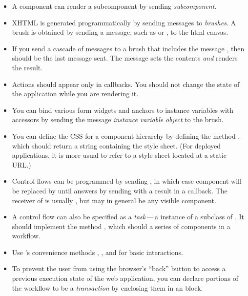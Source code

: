 \documentclass[a4paper,10pt,twoside]{book}
\begin{document}
\begin{itemize}
  \item A component can render a subcomponent by sending  \emph{subcomponent}.
  \item XHTML is generated programmatically by sending messages to \emph{brushes}. A brush is obtained by sending a message, such as  or , to the html canvas.
  \item If you send a cascade of messages to a brush that includes the message , then  should be the last message sent.
  The  message sets the contents \emph{and} renders the result.
  \item Actions should appear only in callbacks.
You should not change the state of the application while you are rendering it.
  \item You can bind various form widgets and anchors to instance variables with accessors by sending the message  \emph{instance variable}  \emph{object} to the brush.
  \item You can define the CSS for a component hierarchy by defining the method , which should return a string containing the style sheet.
  (For deployed applications, it is more usual to refer to a style sheet located at a static URL.)
  \item Control flows can be programmed by sending , in which case component  will be replaced by  until  answers by sending  with a result in a callback.
  The receiver of  is usually , but may in general be any visible component.
  \item A control flow can also be specified as a \emph{task}\,---\,a instance of a subclass of . It should implement the method , which should  a series of components in a workflow.
  \item Use 's convenience methods , ,  and  for basic interactions.
  \item To prevent the user from using the browser's ``back'' button to access a previous execution state of the web application, you can declare portions of the workflow to be a \emph{transaction} by enclosing them in an  block.
\end{itemize}

\ifx\wholebook\relax\else 
   
   
\end{document}
